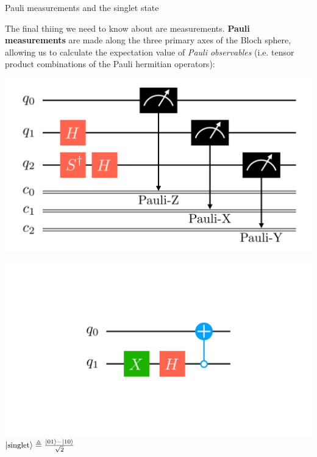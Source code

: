 \documentclass[9pt, handout, aspectratio=169]{beamer}	%
\begin{document}

\begin{frame}{Pauli measurements and the singlet state}

	The final thiing we need to know about are measurements. \textbf{Pauli measurements} are made along the three primary axes of the Bloch sphere, allowing us to calculate the expectation value of \emph{Pauli observables} (i.e. tensor product combinations of the Pauli hermitian operators):

	\begin{multicols}{2}

		\begin{center}
			\includegraphics[width=.40\paperwidth]{Figures/quantum-background/circuit-gates-pauli}
		\end{center}

		\columnbreak

		\pause
		\begin{center}
			\includegraphics[width=.40\paperwidth]{Figures/quantum-background/circuit-gates-singlet}\\ \vspace{-2em}
			$\ket{\text{\small singlet}} \triangleq \frac{\ket{01}-\ket{10}}{\sqrt{2}}$
		\end{center}

	\end{multicols}

\end{frame}
\end{document}
